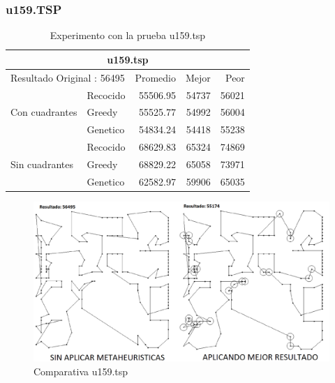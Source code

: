 \subsubsection{u159.TSP}
\begin{table}[hbtp]
 \centering 
	\begin{tabular}{ | l   l | r | r | r |   }
       \hline\multicolumn{5}{|c|}{ \rowcolor[gray]{0.8}u159.tsp} \\\hline
         \multicolumn{2}{|l|}{Resultado Original : 56495} & Promedio & Mejor & Peor \\ \hline
                        & Recocido  & 55506.95 & 54737 & 56021  \\ 
         Con cuadrantes & Greedy    & 55525.77 & 54992 & 56004  \\ 
                        & Genetico  & 54834.24 & 54418 & 55238  \\ \hline
                        & Recocido  & 68629.83 & 65324 & 74869   \\ 
         Sin cuadrantes & Greedy    & 68829.22 & 65058 & 73971   \\ 
                        & Genetico  & 62582.97 & 59906 & 65035    \\ \hline
    \end{tabular}
    \caption{Experimento con la prueba u159.tsp}
    \label{table:EXP_u159.tsp}
\end{table}
\begin{figure}[hbtp]
    \centering
        \includegraphics[width=1\textwidth]{PruebasResultados/Experimentos_Comparativas/u159.png}
        \caption{Comparativa u159.tsp}
        \label{fig:u159_comparativa.png}
\end{figure}
